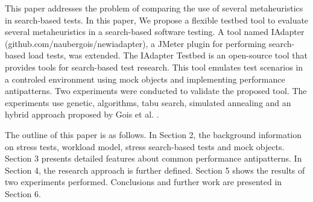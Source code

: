This paper addresses the problem of comparing the use of several metaheuristics in search-based tests. In this paper, We propose a flexible testbed tool to evaluate several metaheuristics in a search-based software testing. A tool named IAdapter (github.com/naubergois/newiadapter), a JMeter plugin for performing search-based load tests, was extended. The IAdapter Testbed is an open-source tool that provides  tools for search-based test research. This tool emulates test scenarios in a controled environment using mock objects and implementing performance antipatterns. Two experiments were conducted to validate the proposed tool. The experiments use genetic, algorithms, tabu search, simulated annealing and an hybrid approach proposed by Gois et al. \cite{Gois2016}.

The outline of this paper is as follows. In Section 2, the background information on stress tests, workload model, stress search-based tests and mock objects. Section 3 presents detailed features about common performance antipatterns. In Section 4, the research approach is further defined.  Section 5 shows the results of two experiments performed.  Conclusions and further work are presented in Section 6.
